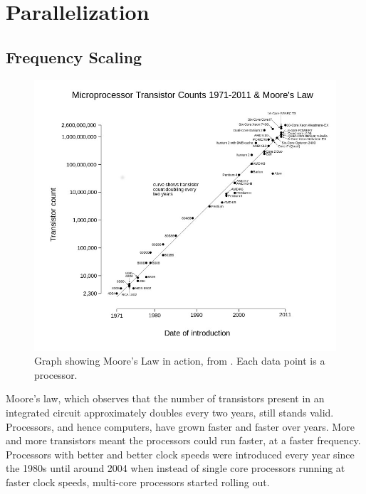 \documentclass[MTech]{iitmdiss}
\begin{document}
\section{Parallelization}
\subsection{Frequency Scaling}
\begin{figure}[h]
    \centering
    \includegraphics[width=\textwidth,scale=0.6,keepaspectratio=true]{mooreslaw.jpg}
    \caption{
        Graph showing Moore's Law in action, from \cite{WikipediaEN:ML}. Each data point is a processor.
    }
    \label{fig:moore's law}
\end{figure}
Moore's law, which observes that the number of transistors present in an integrated circuit approximately doubles every two years, still stands valid. Processors, and hence computers, have grown faster and faster over years. More and more transistors meant the processors could run faster, at a faster frequency. Processors with better and better clock speeds were introduced every year since the 1980s until around 2004 when instead of single core processors running at faster clock speeds, multi-core processors started rolling out.
\end{document}
